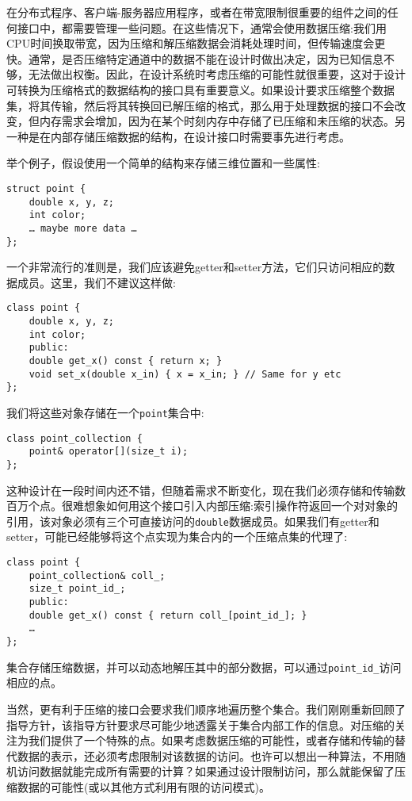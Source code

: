 在分布式程序、客户端-服务器应用程序，或者在带宽限制很重要的组件之间的任何接口中，都需要管理一些问题。在这些情况下，通常会使用数据压缩:我们用CPU时间换取带宽，因为压缩和解压缩数据会消耗处理时间，但传输速度会更快。通常，是否压缩特定通道中的数据不能在设计时做出决定，因为已知信息不够，无法做出权衡。因此，在设计系统时考虑压缩的可能性就很重要，这对于设计可转换为压缩格式的数据结构的接口具有重要意义。如果设计要求压缩整个数据集，将其传输，然后将其转换回已解压缩的格式，那么用于处理数据的接口不会改变，但内存需求会增加，因为在某个时刻内存中存储了已压缩和未压缩的状态。另一种是在内部存储压缩数据的结构，在设计接口时需要事先进行考虑。 

举个例子，假设使用一个简单的结构来存储三维位置和一些属性:

\begin{lstlisting}[style=styleCXX]
struct point {
	double x, y, z;
	int color;
	… maybe more data …
};
\end{lstlisting}

一个非常流行的准则是，我们应该避免getter和setter方法，它们只访问相应的数据成员。这里，我们不建议这样做:

\begin{lstlisting}[style=styleCXX]
class point {
	double x, y, z;
	int color;
	public:
	double get_x() const { return x; }
	void set_x(double x_in) { x = x_in; } // Same for y etc
};
\end{lstlisting}

我们将这些对象存储在一个\texttt{point}集合中:

\begin{lstlisting}[style=styleCXX]
class point_collection {
	point& operator[](size_t i);
};
\end{lstlisting}

这种设计在一段时间内还不错，但随着需求不断变化，现在我们必须存储和传输数百万个点。很难想象如何用这个接口引入内部压缩:索引操作符返回一个对对象的引用，该对象必须有三个可直接访问的\texttt{double}数据成员。如果我们有getter和setter，可能已经能够将这个点实现为集合内的一个压缩点集的代理了:

\begin{lstlisting}[style=styleCXX]
class point {
	point_collection& coll_;
	size_t point_id_;
	public:
	double get_x() const { return coll_[point_id_]; }
	…
};
\end{lstlisting}

集合存储压缩数据，并可以动态地解压其中的部分数据，可以通过\texttt{point\_id\_}访问相应的点。

当然，更有利于压缩的接口会要求我们顺序地遍历整个集合。我们刚刚重新回顾了指导方针，该指导方针要求尽可能少地透露关于集合内部工作的信息。对压缩的关注为我们提供了一个特殊的点。如果考虑数据压缩的可能性，或者存储和传输的替代数据的表示，还必须考虑限制对该数据的访问。也许可以想出一种算法，不用随机访问数据就能完成所有需要的计算？如果通过设计限制访问，那么就能保留了压缩数据的可能性(或以其他方式利用有限的访问模式)。

